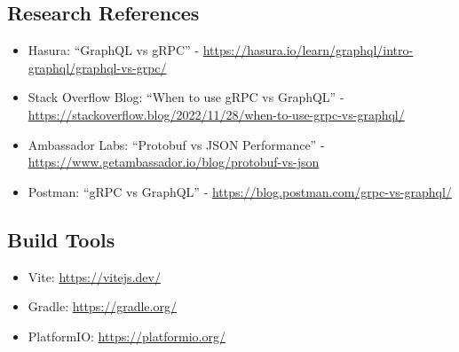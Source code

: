 \documentclass[11pt,letterpaper]{article}
\begin{document}
\subsection{Research References}
\begin{itemize}
    \item Hasura: ``GraphQL vs gRPC'' - \url{https://hasura.io/learn/graphql/intro-graphql/graphql-vs-grpc/}
    \item Stack Overflow Blog: ``When to use gRPC vs GraphQL'' - \url{https://stackoverflow.blog/2022/11/28/when-to-use-grpc-vs-graphql/}
    \item Ambassador Labs: ``Protobuf vs JSON Performance'' - \url{https://www.getambassador.io/blog/protobuf-vs-json}
    \item Postman: ``gRPC vs GraphQL'' - \url{https://blog.postman.com/grpc-vs-graphql/}
\end{itemize}

\subsection{Build Tools}
\begin{itemize}
    \item Vite: \url{https://vitejs.dev/}
    \item Gradle: \url{https://gradle.org/}
    \item PlatformIO: \url{https://platformio.org/}
\end{itemize}
\end{document}

